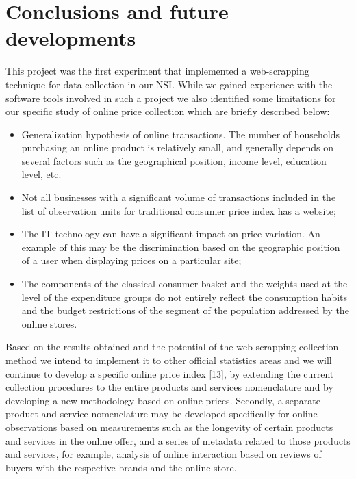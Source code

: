 \documentclass[]{article}
\begin{document}
\section{Conclusions and future developments}\label{conclusions}

This project was the first experiment that implemented a web-scrapping technique for data collection 
in our NSI. While we gained experience with the software tools involved in such a project we also 
identified some limitations for our specific study of online price collection which are briefly described below:
\begin{itemize}
\item Generalization hypothesis of online transactions. The number of households purchasing an 
online product is relatively small, and generally depends on several factors such as the geographical position, 
income level, education level, etc.
\item Not all businesses with a significant volume of transactions included in the list of observation 
units for traditional consumer price index has a website;
\item The IT technology can have a significant impact on price variation. An example of this may be the discrimination 
based on the geographic position of a user when displaying prices on a particular site;
\item The components of the classical consumer basket and the weights used at the level of the expenditure groups do not entirely reflect the consumption habits and the budget restrictions of the segment of the population addressed by the online stores.
\end{itemize}


Based on the results obtained and the potential of the web-scrapping collection method we intend to implement 
it to other official statistics areas and we will continue to develop a specific online price index [13], 
by extending the current collection procedures to the entire products and services nomenclature and by 
developing a new methodology based on online prices. Secondly, a separate product and service nomenclature may 
be developed specifically for online observations based on measurements such as the longevity of certain products 
and services in the online offer, and a series of metadata related to those products and services, for example, analysis of 
online interaction based on reviews of buyers with the respective brands and the online store.
\end{document}
